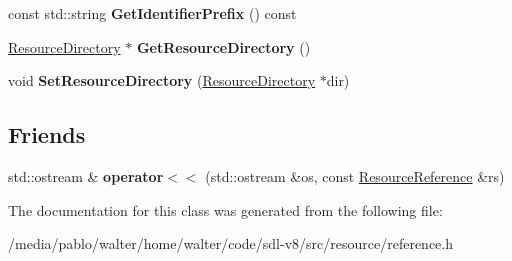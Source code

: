 \begin{DoxyCompactItemize}
\mbox{\label{classResourceReference_aa29673b2d59532095e64162c786b17dc}} 
const std\+::string {\bfseries Get\+Identifier\+Prefix} () const
\item 
\mbox{\label{classResourceReference_aa9b013cb9ef2ed609552259758310f9d}} 
\mbox{\hyperlink{classResourceDirectory}{Resource\+Directory}} $\ast$ {\bfseries Get\+Resource\+Directory} ()
\item 
\mbox{\label{classResourceReference_ae3790360e5b969b91d88dab437025376}} 
void {\bfseries Set\+Resource\+Directory} (\mbox{\hyperlink{classResourceDirectory}{Resource\+Directory}} $\ast$dir)
\end{DoxyCompactItemize}
\subsection*{Friends}
\begin{DoxyCompactItemize}
\item 
\mbox{\label{classResourceReference_affc3b9383d995ecfc77ca2a59c32e6a5}} 
std\+::ostream \& {\bfseries operator$<$$<$} (std\+::ostream \&os, const \mbox{\hyperlink{classResourceReference}{Resource\+Reference}} \&rs)
\end{DoxyCompactItemize}


The documentation for this class was generated from the following file\+:\begin{DoxyCompactItemize}
\item 
/media/pablo/walter/home/walter/code/sdl-\/v8/src/resource/reference.\+h\end{DoxyCompactItemize}
